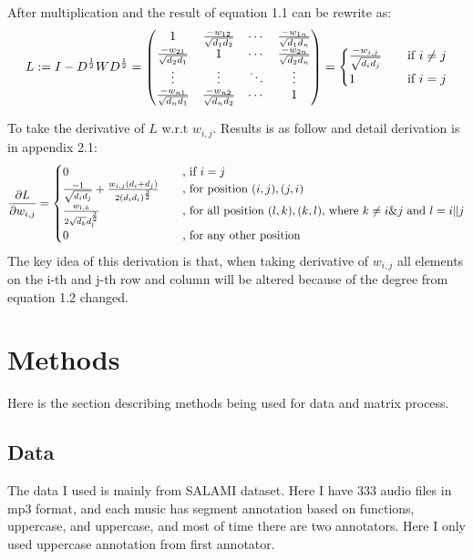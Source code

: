 \documentclass[final]{siamltexmm}
\begin{document}
After multiplication and the result of equation 1.1 can be rewrite as:
\begin{equation}
L := I - D^{1 \over 2}W D^{1 \over 2} =
\begin{pmatrix}
  1 & {-w_{12} \over \sqrt{d_1d_2}} & \cdots & {-w_{1n} \over \sqrt{d_1d_n}} \\
  {-w_{21} \over \sqrt{d_2d_1}} & 1 & \cdots & {-w_{2n} \over \sqrt{d_2d_n}} \\
  \vdots  & \vdots  & \ddots & \vdots  \\
  {-w_{n1} \over \sqrt{d_nd_1}} & {-w_{n2} \over \sqrt{d_nd_2}} & \cdots & 1 \\
\end{pmatrix}
=
\begin{cases}
  {-w_{i,j} \over \sqrt{d_id_j}}       & \quad \text{if } i \neq j\\
  1   & \quad \text{if } i = j\\
\end{cases}
\end{equation}

To take the derivative of $L$ w.r.t $w_{i,j}$. Results is as follow and detail derivation is in appendix 2.1:
\begin{equation}
{\partial L \over \partial w_{i,j}} =
\begin{cases}
  0       & \quad \text{, if $i = j$}\\
  {-1 \over \sqrt{d_id_j}} + {w_{i,j}(d_i+d_j) \over 2(d_id_i)^{3\over 2}} & \quad \text{, for position $(i,j), (j,i)$} \\
  {w_{l,k} \over 2\sqrt{d_k}d_l^{3\over2}}       & \quad \text{, for all position $(l,k), (k,l)$, where $k \neq i \& j$ and $l = i\|j$}\\
  0 & \quad \text{, for any other position} \\
\end{cases}
\end{equation}
The key idea of this derivation is that, when taking derivative of $w_{i,j}$ all elements on the i-th and j-th row and column will be altered because of the degree from equation 1.2 changed.
\section{Methods}
Here is the section describing methods being used for data and matrix process.

\subsection{Data}
The data I used is mainly from SALAMI dataset. Here I have 333 audio files in mp3 format, and each music has segment annotation based on functions, uppercase, and uppercase, and most of time there are two annotators. Here I only used uppercase annotation from first annotator.
\end{document}
